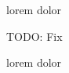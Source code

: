 

\clozesetoption[margin]{1em}
\clozesetoption[thickness]{0.4pt}
lorem  dolor

TODO: Fix

\clozereset
lorem  dolor

\bye
